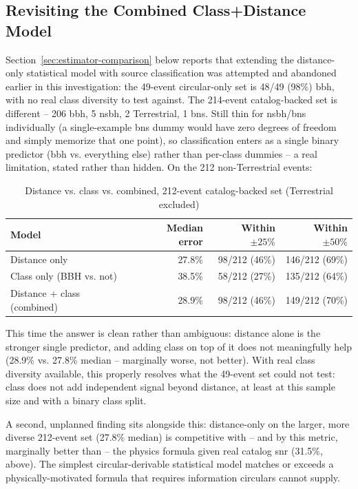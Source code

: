 \subsection{Revisiting the Combined Class+Distance Model}

Section~\ref{sec:estimator-comparison} below reports that extending the distance-only statistical model with source classification was attempted and abandoned earlier in this investigation: the 49-event circular-only set is 48/49 (98\%) \gls{bbh}, with no real class diversity to test against. The 214-event catalog-backed set is different -- 206 \gls{bbh}, 5 \gls{nsbh}, 2 Terrestrial, 1 \gls{bns}. Still thin for \gls{nsbh}/\gls{bns} individually (a single-example \gls{bns} dummy would have zero degrees of freedom and simply memorize that one point), so classification enters as a single binary predictor (\gls{bbh} vs. everything else) rather than per-class dummies -- a real limitation, stated rather than hidden. On the 212 non-Terrestrial events:

\begin{table}[H]
\centering
\caption{Distance vs. class vs. combined, 212-event catalog-backed set (Terrestrial excluded)}
\label{tab:combined-model}
\begin{tabular}{@{}lrrr@{}}
\toprule
Model & Median error & Within $\pm25\%$ & Within $\pm50\%$ \\
\midrule
Distance only & 27.8\% & 98/212 (46\%) & 146/212 (69\%) \\
Class only (BBH vs. not) & 38.5\% & 58/212 (27\%) & 135/212 (64\%) \\
Distance + class (combined) & 28.9\% & 98/212 (46\%) & 149/212 (70\%) \\
\bottomrule
\end{tabular}
\end{table}

This time the answer is clean rather than ambiguous: distance alone is the stronger single predictor, and adding class on top of it does not meaningfully help (28.9\% vs. 27.8\% median -- marginally worse, not better). With real class diversity available, this properly resolves what the 49-event set could not test: class does not add independent signal beyond distance, at least at this sample size and with a binary class split.

A second, unplanned finding sits alongside this: distance-only on the larger, more diverse 212-event set (27.8\% median) is competitive with -- and by this metric, marginally better than -- the physics formula given real catalog \gls{snr} (31.5\%, above). The simplest circular-derivable statistical model matches or exceeds a physically-motivated formula that requires information circulars cannot supply.

